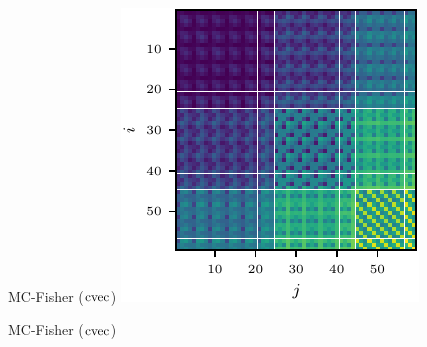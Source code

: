 \begin{figure}[t!]
\begin{minipage}[t]{0.485\linewidth}
  \end{minipage}
  \\
  \begin{minipage}[t]{0.485\linewidth}
    \centering
    MC-Fisher ($\operatorname{cvec}$)\vspace{1ex}
    \includegraphics[width=0.8\linewidth]{../kfs/plots/synthetic_cvec_mcfisher_100_full.pdf}
  \end{minipage}
  \hfill
  \begin{minipage}[t]{0.485\linewidth}
    \centering
    MC-Fisher ($\operatorname{cvec}$)\vspace{1ex}

\end{minipage}
\end{figure}

